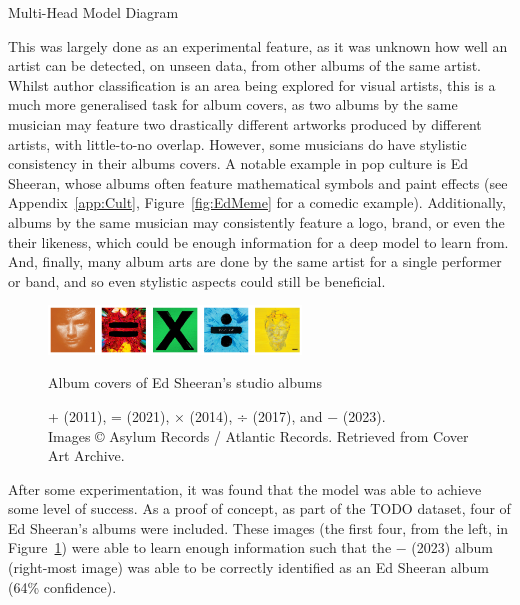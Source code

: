                \begin{temp}
                    Multi-Head Model Diagram
                \end{temp}
    
                This was largely done as an experimental feature, as it was unknown how well an artist can be detected, on unseen data, from other albums of the same artist. Whilst author classification is an area being explored for visual artists, this is a much more generalised task for album covers, as two albums by the same musician may feature two drastically different artworks produced by different artists, with little-to-no overlap. However, some musicians do have stylistic consistency in their albums covers. A notable example in pop culture is Ed Sheeran, whose albums often feature mathematical symbols and paint effects (see Appendix~\ref{app:Cult}, Figure~\ref{fig:EdMeme} for a comedic example). Additionally, albums by the same musician may consistently feature a logo, brand, or even the their likeness, which could be enough information for a deep model to learn from. And, finally, many album arts are done by the same artist for a single performer or band, and so even stylistic aspects could still be beneficial.
    
                \begin{figure}[h]
                    \centering
                    \includegraphics[width=0.6\textwidth]{images/EdAlbums.png}
                    \caption{Album covers of Ed Sheeran’s studio albums}
                    \label{fig:EdAlbums}
                    \caption*{+ (2011), = (2021), × (2014), ÷ (2017), and − (2023). \\ Images © Asylum Records / Atlantic Records. Retrieved from Cover Art Archive.}
                \end{figure}
    
                After some experimentation, it was found that the model was able to achieve some level of success. As a proof of concept, as part of the TODO dataset, four of Ed Sheeran's albums were included. These images (the first four, from the left, in Figure~\ref{fig:EdAlbums}) were able to learn enough information such that the − (2023) album (right-most image) was able to be correctly identified as an Ed Sheeran album (64\% confidence).
    
